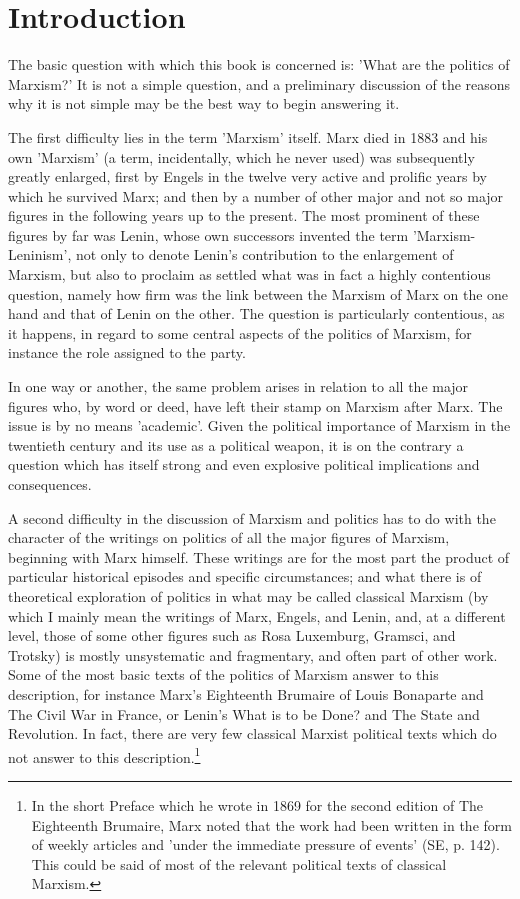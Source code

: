 \chapter*{Introduction}


The basic question with which this book is concerned is: 'What are the politics of Marxism?' It is not a simple question, and a preliminary discussion of the reasons why it is not simple may be the best way to begin answering it.

The first difficulty lies in the term 'Marxism' itself. Marx died in 1883 and his own 'Marxism' (a term, incidentally, which he never used) was subsequently greatly enlarged, first by Engels in the twelve very active and prolific years by which he survived Marx; and then by a number of other major and not so major figures in the following years up to the present. The most prominent of these figures by far was Lenin, whose own successors invented the term 'Marxism-Leninism', not only to denote Lenin's contribution to the enlargement of Marxism, but also to proclaim as settled what was in fact a highly contentious question, namely how firm was the link between the Marxism of Marx on the one hand and that of Lenin on the other. The question is particularly contentious, as it happens, in regard to some central aspects of the politics of Marxism, for instance the role assigned to the party.

In one way or another, the same problem arises in relation to all the major figures who, by word or deed, have left their stamp on Marxism after Marx. The issue is by no means 'academic'. Given the political importance of Marxism in the twentieth century and its use as a political weapon, it is on the contrary a question which has itself strong and even explosive political implications and consequences.

A second difficulty in the discussion of Marxism and politics has to do with the character of the writings on politics of all the major figures of Marxism, beginning with Marx himself. These writings are for the most part the product of particular historical episodes and specific circumstances; and what there is of theoretical exploration of politics in what may be called classical Marxism (by which I mainly mean the writings of Marx, Engels, and Lenin, and, at a different level, those of some other figures such as Rosa Luxemburg, Gramsci, and Trotsky) is mostly unsystematic and fragmentary, and often part of other work. Some of the most basic texts of the politics of Marxism answer to this description, for instance Marx's Eighteenth Brumaire of Louis Bonaparte and The Civil War in France, or Lenin's What is to be Done? and The State and Revolution. In fact, there are very few classical Marxist political texts which do not answer to this description.\footnote{In the short Preface which he wrote in 1869 for the second edition of The Eighteenth Brumaire, Marx noted that the work had been written in the form of weekly articles and 'under the immediate pressure of events' (SE, p. 142). This could be said of most of the relevant political texts of classical Marxism.}

